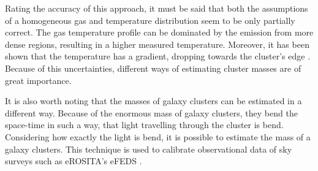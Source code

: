 Rating the accuracy of this approach, it must be said that both the assumptions of a homogeneous gas and temperature distribution seem to be only partially correct. The gas temperature profile can be dominated by the emission from more dense regions, resulting in a higher measured temperature. Moreover, it has been shown that the temperature has a gradient, dropping towards the cluster's edge \citep{McCourt_2013}.
Because of this uncertainties, different ways of estimating cluster masses are of great importance.

It is also worth noting that the masses of galaxy clusters can be estimated in a different way. Because of the enormous mass of galaxy clusters, they bend the space-time in such a way, that light travelling through the cluster is bend. Considering how exactly the light is bend, it is possible to estimate the mass of a galaxy clusters. This technique is used to calibrate observational data of sky surveys such as eROSITA's eFEDS \citep{Chiu_2022}.